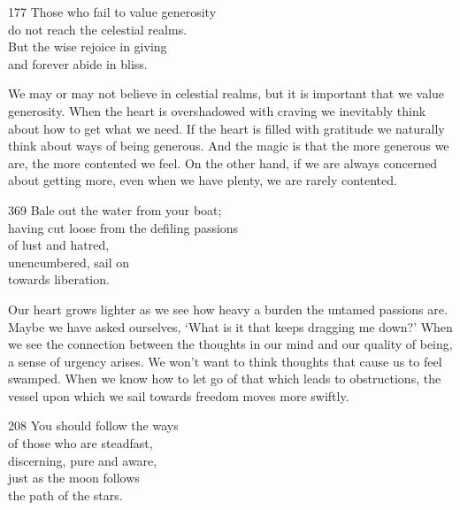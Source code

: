 
\begin{dhpVerse}{177}
\label{dhp-177}
Those who fail to value generosity\\
do not reach the celestial realms. \\
But the wise rejoice in giving\\
and forever abide in bliss.
\end{dhpVerse}

\begin{dhpRefl}
We may or may not believe in celestial realms, but it is important that we value generosity. When the heart is overshadowed with craving we inevitably think about how to get what we need. If the heart is filled with gratitude we naturally think about ways of being generous. And the magic is that the more generous we are, the more contented we feel. On the other hand, if we are always concerned about getting more, even when we have plenty, we are rarely contented.
\end{dhpRefl}


\begin{dhpVerse}{369}
\label{dhp-369}
Bale out the water from your boat;\\
having cut loose from the defiling passions\\
of lust and hatred,\\
unencumbered, sail on\\
towards liberation.
\end{dhpVerse}

\begin{dhpRefl}
Our heart grows lighter as we see how heavy a burden the untamed passions are. Maybe we have asked ourselves, `What is it that keeps dragging me down?' When we see the connection between the thoughts in our mind and our quality of being, a sense of urgency arises. We won't want to think thoughts that cause us to feel swamped. When we know how to let go of that which leads to obstructions, the vessel upon which we sail towards freedom moves more swiftly.
\end{dhpRefl}


\begin{dhpVerse}{208}
\label{dhp-208}
You should follow the ways\\
of those who are steadfast,\\
discerning, pure and aware,\\
just as the moon follows\\
the path of the stars.
\end{dhpVerse}

